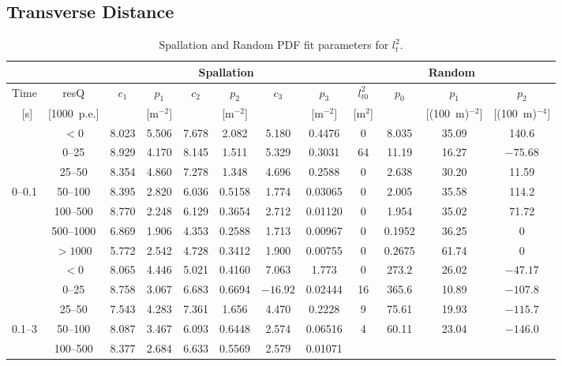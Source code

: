\subsection{Transverse Distance}


\begin{table*}[hbt]
\centering
\caption{Spallation and Random PDF fit parameters for $l_t^2$.}
\begin{tabular}{cc|cccccc|cccc}
\toprule
& & \multicolumn{6}{c|}{Spallation} & \multicolumn{4}{c}{Random} \\
\hline
Time  & resQ    & $c_1$ & $p_1$ & $c_2$ & $p_2$   & $c_3$ & $p_3$ &
$l_{t0}^2$ & $p_0$ & $p_1$      & $p_2$ \\
~[s] & [1000~p.e.] &  & [m$^{-2}$] &   &  [m$^{-2}$] &  & [m$^{-2}$] &
[m$^2$]  &       & [(100~m)$^{-2}$] & [(100~m)$^{-4}$] \\
\hline
      & $<0$    & 8.023 & 5.506 & 7.678 & 2.082   & 5.180 & 0.4476  &
      0  & 8.035  & 35.09 & 140.6  \\
      & 0--25    & 8.929 & 4.170 & 8.145 & 1.511   & 5.329 & 0.3031  &
      64 & 11.19  & 16.27 & $-75.68$ \\
      & 25--50   & 8.354 & 4.860 & 7.278 & 1.348   & 4.696 & 0.2588  &
      0  & 2.638  & 30.20 &  11.59 \\
0--0.1 & 50--100  & 8.395 & 2.820 & 6.036 & 0.5158  & 1.774 & 0.03065 &
      0  & 2.005  & 35.58 & 114.2  \\
      & 100--500 & 8.770 & 2.248 & 6.129 & 0.3654  & 2.712 & 0.01120 &
      0  & 1.954  & 35.02 &  71.72 \\
      & 500--1000& 6.869 & 1.906 & 4.353 & 0.2588  & 1.713 & 0.00967 &
      0  & 0.1952 & 36.25 &   0    \\
      & $>1000$ & 5.772 & 2.542 & 4.728 & 0.3412  & 1.900 & 0.00755 &
      0  & 0.2675 & 61.74 &   0    \\
\hline
      & $<0$    & 8.065 & 4.446 & 5.021 & 0.4160  & 7.063 & 1.773   &
      0  & 273.2 & 26.02 & $-47.17$  \\
      & 0--25    & 8.758 & 3.067 & 6.683 & 0.6694  & $-16.92$ & 0.02444 &
      16 & 365.6 & 10.89 &$-107.8$   \\
      & 25--50   & 7.543 & 4.283 & 7.361 & 1.656   & 4.470 & 0.2228  &
      9  & 75.61 & 19.93 &$-115.7$   \\
0.1--3 & 50--100  & 8.087 & 3.467 & 6.093 & 0.6448  & 2.574 & 0.06516 &
      4  & 60.11 & 23.04 &$-146.0$   \\
      & 100--500 & 8.377 & 2.684 & 6.633 & 0.5569  & 2.579 & 0.01071 &

\end{tabular}
\end{table*}
